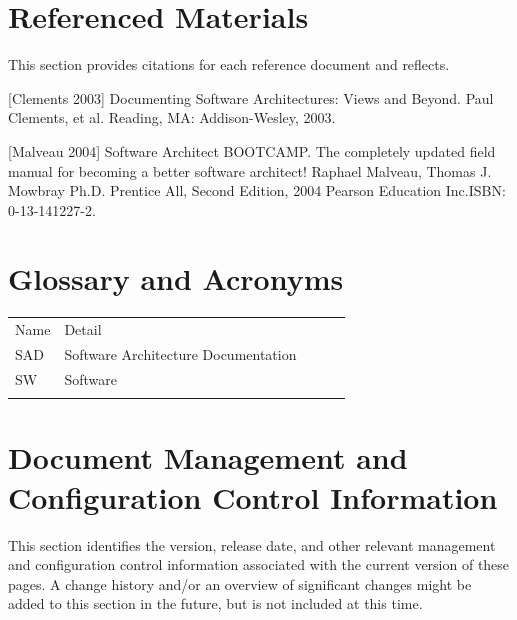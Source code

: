 \documentclass[a4paper,11pt]{book}
\begin{document}
\chapter{Referenced Materials}

This section provides citations for each reference document and reflects.
\newline

[Clements 2003]
Documenting Software Architectures: Views and Beyond. Paul Clements, et al. Reading, MA: Addison-Wesley, 2003.
\newline

[Malveau 2004]
Software Architect BOOTCAMP. The completely updated field manual for becoming a better software architect! Raphael Malveau, Thomas J. Mowbray Ph.D. Prentice All, Second Edition, 2004 Pearson Education Inc.ISBN: 0-13-141227-2. 
\newline

\chapter{Glossary and Acronyms}

\begin{table}[h]
\begin{tabular}{lllll}
\cline{1-2}
\multicolumn{1}{|l|}{Name} & \multicolumn{1}{l|}{Detail}                              &  &  &  \\ \cline{1-2}
\multicolumn{1}{|l|}{SAD}  & \multicolumn{1}{l|}{Software Architecture Documentation} &  &  &  \\ \cline{1-2}
\multicolumn{1}{|l|}{SW}   & \multicolumn{1}{l|}{Software}                            &  &  &  \\ \cline{1-2}
                           &                                                          &  &  & 
\end{tabular}
\end{table}

\chapter{Document Management and Configuration Control Information}

This section identifies the version, release date, and other relevant management and configuration control information associated with the current version of these pages. A change history and/or an overview of significant changes might be added to this section in the future, but is not included at this time.
\end{document}
